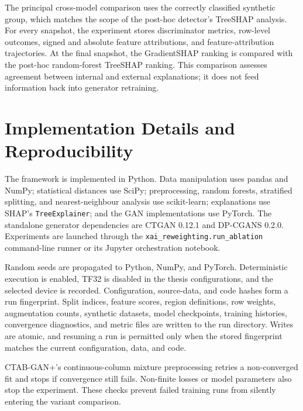 The principal cross-model comparison uses the correctly classified synthetic
group, which matches the scope of the post-hoc detector's TreeSHAP analysis.
For every snapshot, the experiment stores discriminator metrics, row-level
outcomes, signed and absolute feature attributions, and feature-attribution
trajectories. At the final snapshot, the GradientSHAP ranking is compared with
the post-hoc random-forest TreeSHAP ranking. This comparison assesses agreement
between internal and external explanations; it does not feed information back
into generator retraining.

\section{Implementation Details and Reproducibility}
\label{sec:implementation_details}

The framework is implemented in Python. Data manipulation uses pandas and
NumPy; statistical distances use SciPy; preprocessing, random forests,
stratified splitting, and nearest-neighbour analysis use scikit-learn;
explanations use SHAP's \texttt{TreeExplainer}; and the GAN implementations use
PyTorch. The standalone generator dependencies are CTGAN 0.12.1 and DP-CGANS
0.2.0. Experiments are launched through the
\texttt{xai\_reweighting.run\_ablation} command-line runner or its Jupyter
orchestration notebook.

Random seeds are propagated to Python, NumPy, and PyTorch. Deterministic
execution is enabled, TF32 is disabled in the thesis configurations, and the
selected device is recorded. Configuration, source-data, and code hashes form
a run fingerprint. Split indices, feature scores, region definitions, row
weights, augmentation counts, synthetic datasets, model checkpoints, training
histories, convergence diagnostics, and metric files are written to the run
directory. Writes are atomic, and resuming a run is permitted only when the
stored fingerprint matches the current configuration, data, and code.

CTAB-GAN+'s continuous-column mixture preprocessing retries a non-converged fit
and stops if convergence still fails. Non-finite losses or model parameters also stop
the experiment. These checks prevent failed training runs from silently
entering the variant comparison.
